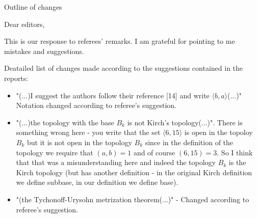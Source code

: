 \documentclass[12pt]{article}
\theoremstyle{plain}
\theoremstyle{definition}
\theoremstyle{remark}
\begin{document}
\begin{center}
\Large{Outline of changes}
\end{center}

Dear editors,

This is our response to referees' remarks. I am grateful for pointing to me mistakes and suggestions.

Deatailed list of changes made according to the suggestions contained in the reports:


\begin{itemize}
	
\item  "(...)I suggest the authors follow their reference [14] and
write $\langle b, a\rangle$(...)" Notation changed according to referee's suggestion.

\item "(...)the topology with the base $B_k$ is not Kirch's topology(...)". There is something
wrong here - you write that the set $\langle 6, 15\rangle$ is open in the topoloy
$B_k$ but it is not open in the topology $B_k$ since in the definition of the topology we require that
$(a,b) = 1$ and of course $(6, 15) = 3$. So I think that that was a misunderstanding
here and indeed the topology $B_k$ is the Kirch topology (but has another definition - 
in the original Kirch definition we define subbase, in our definition we define base).

\item "(the Tychonoff-Urysohn metrization theorem(...)" - Changed according to referee's suggestion.


\end{itemize}
\end{document}
